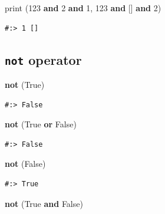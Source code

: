 \documentclass[
]{book}
\newenvironment{Shaded}{\begin{snugshade}}{\end{snugshade}}
\newcommand{\BuiltInTok}[1]{#1}
\newcommand{\DecValTok}[1]{\textcolor[rgb]{0.06,0.06,0.06}{#1}}
\newcommand{\KeywordTok}[1]{\textcolor[rgb]{0.27,0.27,0.27}{\textbf{#1}}}
\newcommand{\NormalTok}[1]{#1}
\newcommand{\VariableTok}[1]{\textcolor[rgb]{0,0,0}{#1}}
\begin{document}
\begin{Shaded}
\begin{Highlighting}[]
\BuiltInTok{print}\NormalTok{ (}\DecValTok{123} \KeywordTok{and} \DecValTok{2} \KeywordTok{and} \DecValTok{1}\NormalTok{,}
       \DecValTok{123} \KeywordTok{and}\NormalTok{ [] }\KeywordTok{and} \DecValTok{2}\NormalTok{)}
\end{Highlighting}
\end{Shaded}

\begin{verbatim}
#:> 1 []
\end{verbatim}

\hypertarget{not-operator}{%
\subsection{\texorpdfstring{\texttt{not} operator}{not operator}}\label{not-operator}}

\begin{Shaded}
\begin{Highlighting}[]
\KeywordTok{not}\NormalTok{ (}\VariableTok{True}\NormalTok{)}
\end{Highlighting}
\end{Shaded}

\begin{verbatim}
#:> False
\end{verbatim}

\begin{Shaded}
\begin{Highlighting}[]
\KeywordTok{not}\NormalTok{ (}\VariableTok{True} \KeywordTok{or} \VariableTok{False}\NormalTok{)}
\end{Highlighting}
\end{Shaded}

\begin{verbatim}
#:> False
\end{verbatim}

\begin{Shaded}
\begin{Highlighting}[]
\KeywordTok{not}\NormalTok{ (}\VariableTok{False}\NormalTok{)}
\end{Highlighting}
\end{Shaded}

\begin{verbatim}
#:> True
\end{verbatim}

\begin{Shaded}
\begin{Highlighting}[]
\KeywordTok{not}\NormalTok{ (}\VariableTok{True} \KeywordTok{and} \VariableTok{False}\NormalTok{)}
\end{Highlighting}
\end{Shaded}
\end{document}
